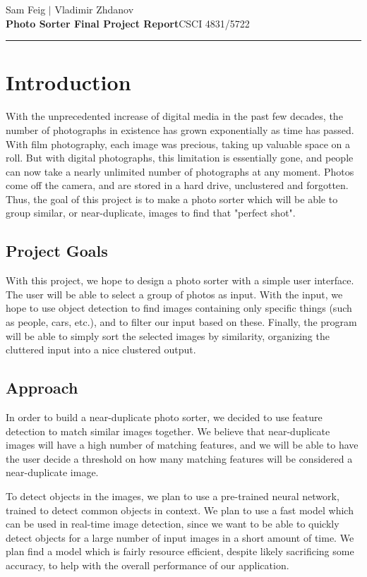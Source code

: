 \documentclass[12pt]{article}
\begin{document}
\hfill Sam Feig $|$ Vladimir Zhdanov \\
\textbf{Photo Sorter Final Project Report}\hfill CSCI 4831/5722 \\
\rule{\textwidth}{.75pt}

\section{Introduction}
	With the unprecedented increase of digital media in the past few decades, the number of photographs in existence has grown exponentially as time has passed. With film photography, each image was precious, taking up valuable space on a roll. But with digital photographs, this limitation is essentially gone, and people can now take a nearly unlimited number of photographs at any moment. Photos come off the camera, and are stored in a hard drive, unclustered and forgotten. Thus, the goal of this project is to make a photo sorter which will be able to group similar, or near-duplicate, images to find that "perfect shot".

\subsection{Project Goals}
	With this project, we hope to design a photo sorter with a simple user interface. The user will be able to select a group of photos as input. With the input, we hope to use object detection to find images containing only specific things (such as people, cars, etc.), and to filter our input based on these. Finally, the program will be able to simply sort the selected images by similarity, organizing the cluttered input into a nice clustered output.

\subsection{Approach}
	In order to build a near-duplicate photo sorter, we decided to use feature detection to match similar images together. We believe that near-duplicate images will have a high number of matching features, and we will be able to have the user decide a threshold on how many matching features will be considered a near-duplicate image. 
	
	To detect objects in the images, we plan to use a pre-trained neural network, trained to detect common objects in context. We plan to use a fast model which can be used in real-time image detection, since we want to be able to quickly detect objects for a large number of input images in a short amount of time. We plan find a model which is fairly resource efficient, despite likely sacrificing some accuracy, to help with the overall performance of our application.
	
\end{document}
